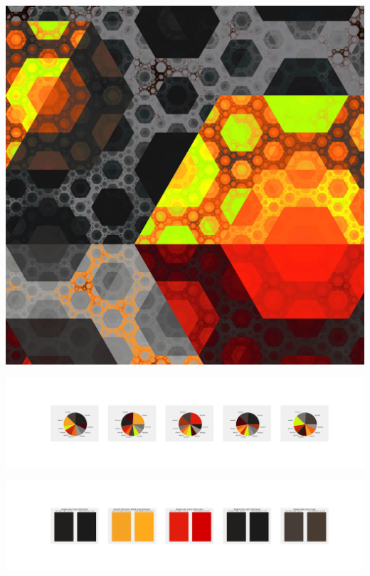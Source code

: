 \documentclass[11pt]{article}
\begin{document}
\begin{landscape}
    \begin{center}
    \includegraphics[width=\textwidth]{./nbimg/file (354).jpg}
    \end{center}

    \begin{center}
    \includegraphics[width=250mm]{./nbimg/pie-283.jpg}
    \end{center}

    \begin{center}
    \includegraphics[width=250mm]{./nbimg/peak-283.jpg}
    \end{center}
    


\end{landscape}
\end{document}
